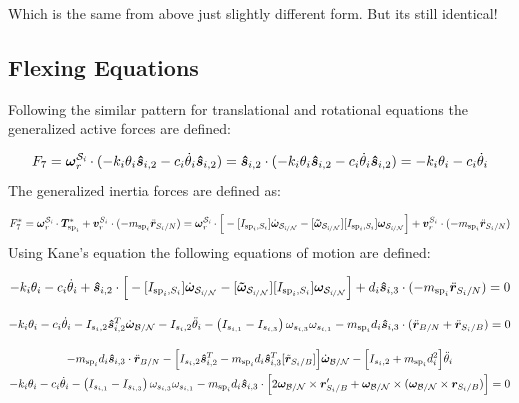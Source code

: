 \documentclass[paper]{aiaaNew}
\begin{document}
Which is the same from above just slightly different form. But its still identical!

\subsection{Flexing Equations}
Following the similar pattern for translational and rotational equations the generalized active forces are defined:

\begin{equation}
F_{7} = \bm \omega_{\textit{r}}^{\cal{S}_\textit{i}} \cdot (-k_i \theta_i \bm{\hat{s}}_{i,2} - c_i \dot{\theta}_i \bm{\hat{s}}_{i,2}) = \bm{\hat{s}}_{i,2} \cdot (-k_i \theta_i \bm{\hat{s}}_{i,2} - c_i \dot{\theta}_i \bm{\hat{s}}_{i,2}) = -k_i \theta_i - c_i \dot{\theta}_i
\end{equation}
The generalized inertia forces are defined as: 

\begin{equation}
F^*_{7} = \bm \omega_{\textit{r}}^{\cal{S}_\textit{i}} \cdot \bm T^*_{\text{sp}_i}  + \bm v^{S_i}_{r} \cdot (-m_{\text{sp}_i} \ddot{\bm r}_{S_{i}/N}) = \bm \omega_{\textit{r}}^{\cal{S}_\textit{i}} \cdot \Big[-[I_{\text{sp}_i,S_i}] \dot{\bm\omega}_{\cal S_{\textit{i}/N}}  -[\bm{\tilde{\omega}}_{\cal S_{\textit{i}/N}}] [I_{\text{sp}_i,S_i}] \bm\omega_{\cal S_{\textit{i}/N}} \Big] + \bm v^{S_i}_{r} \cdot (-m_{\text{sp}_i} \ddot{\bm r}_{S_{i}/N})
\end{equation}
Using Kane's equation the following equations of motion are defined:

\begin{equation}
-k_i \theta_i - c_i \dot{\theta}_i + \bm{\hat{s}}_{i,2} \cdot \Big[-[I_{\text{sp}_i,S_i}] \dot{\bm\omega}_{\cal S_{\textit{i}/N}}  -[\bm{\tilde{\omega}}_{\cal S_{\textit{i}/N}}] [I_{\text{sp}_i,S_i}] \bm\omega_{\cal S_{\textit{i}/N}} \Big] + d_i \bm{\hat{s}}_{i,3} \cdot (-m_{\text{sp}_i} \ddot{\bm r}_{S_{i}/N}) = 0
\end{equation}

\begin{equation}
-k_i \theta_i - c_i \dot{\theta}_i - I_{s_i,2} \bm{\hat{s}}_{i,2}^T \dot{\bm\omega}_{\cal B/N} - I_{s_i,2} \ddot{\theta}_i - \left( I_{s_{i,1}} - I_{s_{i,3}}\right) \omega_{s_{i,3}} \omega_{s_{i,1}} - m_{\text{sp}_i} d_i \bm{\hat{s}}_{i,3} \cdot (\ddot{\bm r}_{B/N} + \ddot{\bm r}_{S_{i}/B}) = 0
\end{equation}

\begin{multline}
- m_{\text{sp}_i} d_i \bm{\hat{s}}_{i,3} \cdot \ddot{\bm r}_{B/N} - \Big[I_{s_i,2} \bm{\hat{s}}_{i,2}^T - m_{\text{sp}_i} d_i \bm{\hat{s}}_{i,3}^T [\tilde{\bm{r}}_{S_i/B}] \Big] \dot{\bm\omega}_{\cal B/N} - \Big[I_{s_i,2} + m_{\text{sp}_i} d_i^2 \Big] \ddot{\theta}_i \\
-k_i \theta_i - c_i \dot{\theta}_i - \left( I_{s_{i,1}} - I_{s_{i,3}}\right) \omega_{s_{i,3}} \omega_{s_{i,1}} - m_{\text{sp}_i} d_i \bm{\hat{s}}_{i,3} \cdot \Big[ 
2 \bm\omega_{\cal B/N} \times \bm{r}'_{S_i/B}
+ \bm\omega_{\cal B/N} \times (\bm\omega_{\cal B/N} \times \bm{r}_{S_i/B})\Big] = 0
\end{multline}
\end{document}
